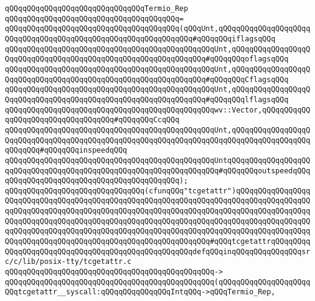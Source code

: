 \newline
\verb|qQQqqQQqqQQqqQQqqQQqqQQqqQQqqQQqTermio_Rep|\newline
\verb|qQQqqQQqqQQqqQQqqQQqqQQqqQQqqQQqqQQqqQQq=|\newline
\verb|qQQqqQQqqQQqqQQqqQQqqQQqqQQqqQQqqQQqqQQq(qQQqUnt,qQQqqQQqqQQqqQQqqQQqqQQqqQQqqQQqqQQqqQQqqQQqqQQqqQQqqQQqqQQqqQQq#qQQqqQQqiflagsqQQq|\newline
\verb|qQQqqQQqqQQqqQQqqQQqqQQqqQQqqQQqqQQqqQQqqQQqqQQqUnt,qQQqqQQqqQQqqQQqqQQqqQQqqQQqqQQqqQQqqQQqqQQqqQQqqQQqqQQqqQQqqQQq#qQQqqQQqoflagsqQQq|\newline
\verb|qQQqqQQqqQQqqQQqqQQqqQQqqQQqqQQqqQQqqQQqqQQqqQQqUnt,qQQqqQQqqQQqqQQqqQQqqQQqqQQqqQQqqQQqqQQqqQQqqQQqqQQqqQQqqQQqqQQq#qQQqqQQqCflagsqQQq|\newline
\verb|qQQqqQQqqQQqqQQqqQQqqQQqqQQqqQQqqQQqqQQqqQQqqQQqUnt,qQQqqQQqqQQqqQQqqQQqqQQqqQQqqQQqqQQqqQQqqQQqqQQqqQQqqQQqqQQqqQQq#qQQqqQQqlflagsqQQq|\newline
\verb|qQQqqQQqqQQqqQQqqQQqqQQqqQQqqQQqqQQqqQQqqQQqqQQqwv::Vector,qQQqqQQqqQQqqQQqqQQqqQQqqQQqqQQqqQQq#qQQqqQQqCcqQQq|\newline
\verb|qQQqqQQqqQQqqQQqqQQqqQQqqQQqqQQqqQQqqQQqqQQqqQQqUnt,qQQqqQQqqQQqqQQqqQQqqQQqqQQqqQQqqQQqqQQqqQQqqQQqqQQqqQQqqQQqqQQqqQQqqQQqqQQqqQQqqQQqqQQqqQQqqQQq#qQQqqQQqinspeedqQQq|\newline
\verb|qQQqqQQqqQQqqQQqqQQqqQQqqQQqqQQqqQQqqQQqqQQqqQQqUntqQQqqQQqqQQqqQQqqQQqqQQqqQQqqQQqqQQqqQQqqQQqqQQqqQQqqQQqqQQqqQQqqQQq#qQQqqQQqoutspeedqQQq|\newline
\verb|qQQqqQQqqQQqqQQqqQQqqQQqqQQqqQQqqQQqqQQq);|\newline
\newline
\verb|qQQqqQQqqQQqqQQqqQQqqQQqqQQqqQQq(cfunqQQq"tcgetattr")qQQqqQQqqQQqqQQqqQQqqQQqqQQqqQQqqQQqqQQqqQQqqQQqqQQqqQQqqQQqqQQqqQQqqQQqqQQqqQQqqQQqqQQqqQQqqQQqqQQqqQQqqQQqqQQqqQQqqQQqqQQqqQQqqQQqqQQqqQQqqQQqqQQqqQQqqQQqqQQqqQQqqQQqqQQqqQQqqQQqqQQqqQQqqQQqqQQqqQQqqQQqqQQqqQQqqQQqqQQqqQQqqQQqqQQqqQQqqQQqqQQqqQQqqQQqqQQqqQQqqQQqqQQqqQQqqQQqqQQqqQQqqQQqqQQqqQQqqQQqqQQqqQQqqQQqqQQqqQQqqQQqqQQqqQQqqQQqqQQqqQQq#qQQqtcgetattrqQQqqQQqqQQqqQQqqQQqqQQqqQQqqQQqqQQqqQQqqQQqqQQqqQQqdefqQQqinqQQqqQQqqQQqqQQqsrc/c/lib/posix-tty/tcgetattr.c|\newline
\verb|qQQqqQQqqQQqqQQqqQQqqQQqqQQqqQQqqQQqqQQqqQQqqQQq->|\newline
\verb|qQQqqQQqqQQqqQQqqQQqqQQqqQQqqQQqqQQqqQQqqQQqqQQq(qQQqqQQqqQQqqQQqqQQqqQQqtcgetattr__syscall:qQQqqQQqqQQqqQQqIntqQQq->qQQqTermio_Rep,|\newline
